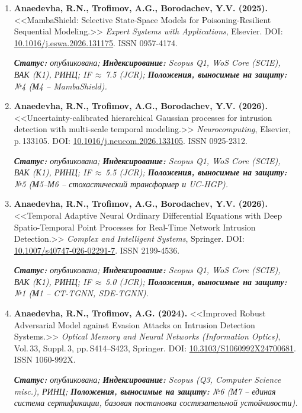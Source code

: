 \documentclass[11pt,a4paper]{article}
\newcommand{\pubmeta}[3]{%
  \par\smallskip\textit{\small\textbf{Статус:} #1; \textbf{Индексирование:} #2; \textbf{Положения, выносимые на защиту:} #3.}\par}
\begin{document}
\begin{enumerate}[leftmargin=*, itemsep=0.3em]

\item \textbf{Anaedevha, R.N., Trofimov, A.G., Borodachev, Y.V. (2025).} <<MambaShield: Selective State-Space Models for Poisoning-Resilient Sequential Modeling.>> \textit{Expert Systems with Applications}, Elsevier. DOI: \href{https://doi.org/10.1016/j.eswa.2026.131175}{10.1016/j.eswa.2026.131175}. ISSN 0957-4174.
\pubmeta{опубликована}{Scopus Q1, WoS Core (SCIE), ВАК (К1), РИНЦ; IF\,$\approx$\,7.5 (JCR)}{№4 (М4 -- MambaShield)}

\item \textbf{Anaedevha, R.N., Trofimov, A.G., Borodachev, Y.V. (2026).} <<Uncertainty-calibrated hierarchical Gaussian processes for intrusion detection with multi-scale temporal modeling.>> \textit{Neurocomputing}, Elsevier, p.\,133105. DOI: \href{https://doi.org/10.1016/j.neucom.2026.133105}{10.1016/j.neucom.2026.133105}. ISSN 0925-2312.
\pubmeta{опубликована}{Scopus Q1, WoS Core (SCIE), ВАК (К1), РИНЦ; IF\,$\approx$\,5.5 (JCR)}{№5 (М5--М6 -- стохастический трансформер и UC-HGP)}

\item \textbf{Anaedevha, R.N., Trofimov, A.G., Borodachev, Y.V. (2026).} <<Temporal Adaptive Neural Ordinary Differential Equations with Deep Spatio-Temporal Point Processes for Real-Time Network Intrusion Detection.>> \textit{Complex and Intelligent Systems}, Springer. DOI: \href{https://doi.org/10.1007/s40747-026-02291-7}{10.1007/s40747-026-02291-7}. ISSN 2199-4536.
\pubmeta{опубликована}{Scopus Q1, WoS Core (SCIE), ВАК (К1), РИНЦ; IF\,$\approx$\,5.0 (JCR)}{№1 (М1 -- CT-TGNN, SDE-TGNN)}

\item \textbf{Anaedevha, R.N., Trofimov, A.G. (2024).} <<Improved Robust Adversarial Model against Evasion Attacks on Intrusion Detection Systems.>> \textit{Optical Memory and Neural Networks (Information Optics)}, Vol.\,33, Suppl.\,3, pp.\,S414--S423, Springer. DOI: \href{https://doi.org/10.3103/S1060992X24700681}{10.3103/S1060992X24700681}. ISSN 1060-992X.
\pubmeta{опубликована}{Scopus (Q3, Computer Science misc.), РИНЦ}{№6 (М7 -- единая система сертификации, базовая постановка состязательной устойчивости)}

\end{enumerate}

\vspace{-0.3cm}
\end{document}
